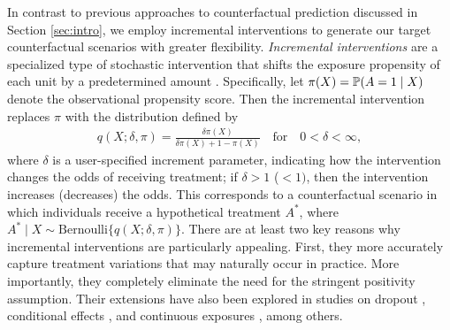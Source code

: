 In contrast to previous approaches to counterfactual prediction discussed in Section \ref{sec:intro}, we employ incremental interventions to generate our target counterfactual scenarios with greater flexibility. \emph{Incremental interventions} are a specialized type of stochastic intervention that shifts the exposure propensity of each unit by a predetermined amount \citep{kennedy2019nonparametric}. Specifically, let $\pi(X)=\mathbb{P}(A=1 \mid X)$ denote the observational propensity score. Then the incremental intervention replaces $\pi$ with the distribution defined by
\begin{align*}
    q(X; \delta, \pi) = \frac{\delta \pi(X)}{\delta \pi(X) + 1 - \pi(X)} \quad \text{for} \quad 0 < \delta < \infty,
\end{align*}
where $\delta$ is a user-specified increment parameter, indicating  how the intervention changes the odds of receiving treatment; if $\delta > 1$ ($< 1)$, then the intervention increases (decreases) the odds. This corresponds to a counterfactual scenario in which individuals receive a hypothetical treatment $A^*$, where $A^*\mid X \sim \text{Bernoulli} \{ q(X; \delta, \pi) \}$. There are at least two key reasons why incremental interventions are particularly appealing. First, they more accurately capture treatment variations that may naturally occur in practice. More importantly, they completely eliminate the need for the stringent positivity assumption. Their extensions have also been explored in studies on dropout \citep{kim2021incremental}, conditional effects \citep{mcclean2024nonparametric}, and continuous exposures \citep{schindl2024incremental}, among others.

